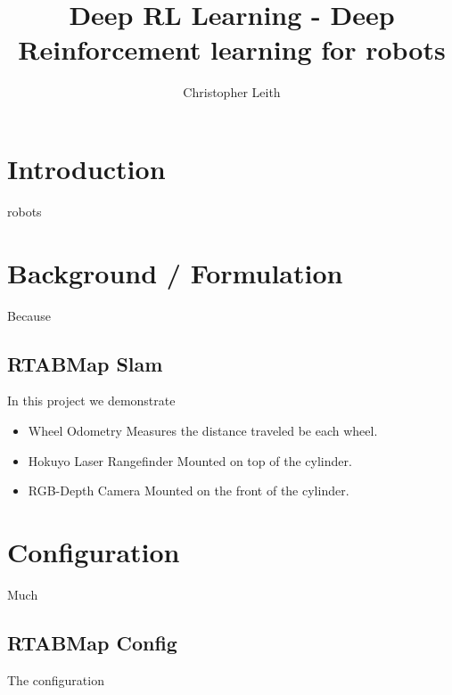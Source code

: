 \documentclass[10pt,journal,compsoc]{IEEEtran}
\begin{document}
\title{Deep RL Learning - Deep Reinforcement learning for robots}

\author{Christopher Leith}

%
{}


\maketitle
\IEEEdisplaynontitleabstractindextext
\IEEEpeerreviewmaketitle
\label{sec:Introduction}
\section{Introduction}
 robots 
\section{Background / Formulation}
Because 

\subsection{RTABMap Slam}
In this project we demonstrate 

\begin{itemize}
 \item Wheel Odometry
 Measures the distance traveled be each wheel.
 \item Hokuyo Laser Rangefinder
 Mounted on top of the cylinder.
 \item RGB-Depth Camera
 Mounted on the front of the cylinder.
\end{itemize}



\section{Configuration}
Much 

\subsection{RTABMap Config}
 The configuration 
 
\end{document}
